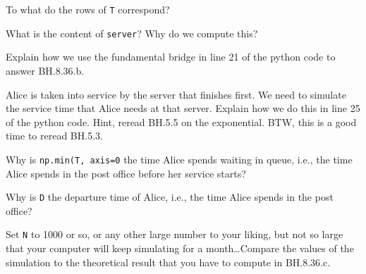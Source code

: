 \documentclass[assignments]{subfiles}
\begin{document}
\begin{exercise}
To what do the rows of \texttt{T} correspond?
\begin{solution}
\end{solution}
\end{exercise}

\begin{exercise}
What is the content of \texttt{server}? Why do we compute this?
\begin{solution}
\end{solution}
\end{exercise}

\begin{exercise}
Explain how we use the fundamental bridge in line 21 of the python code to answer BH.8.36.b.
\begin{solution}
\end{solution}
\end{exercise}


\begin{exercise}
Alice is taken into service by the server that finishes first.
We need to simulate the service time that Alice needs at that server.
Explain how we do this in line 25 of the python code. Hint, reread BH.5.5 on the exponential. BTW, this is a good time to reread BH.5.3.
\begin{solution}
\end{solution}
\end{exercise}

\begin{exercise}
Why is \texttt{np.min(T, axis=0} the time Alice spends waiting in queue, i.e., the time Alice spends in the post office before her service starts?
\begin{solution}
\end{solution}
\end{exercise}


\begin{exercise}
Why is \texttt{D} the departure time of Alice, i.e., the time Alice spends in the post office?
\begin{solution}
\end{solution}
\end{exercise}


\begin{exercise}
Set \texttt{N} to 1000 or so, or any other large number to your liking, but not so large that your computer will keep simulating for a month\ldots Compare the values of the simulation to the theoretical result that you have to compute in BH.8.36.c.
\begin{solution}
\end{solution}
\end{exercise}
\end{document}
